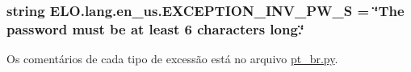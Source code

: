 \hypertarget{namespaceELO_1_1lang_1_1en__us_a1b23e43e3041caedae9ed318310bee4b}{
\subsubsection[{E\-X\-C\-E\-P\-T\-I\-O\-N\-\_\-\-I\-N\-V\-\_\-\-P\-W\-\_\-\-S}]{\setlength{\rightskip}{0pt plus 5cm}string E\-L\-O.\-lang.\-en\-\_\-us.\-E\-X\-C\-E\-P\-T\-I\-O\-N\-\_\-\-I\-N\-V\-\_\-\-P\-W\-\_\-\-S = \char`\"{}The password must be at least 6 characters long.\char`\"{}}}\label{dd/d09/namespaceELO_1_1lang_1_1en__us_a1b23e43e3041caedae9ed318310bee4b}


Os comentários de cada tipo de excessão está no arquivo \hyperlink{pt__br_8py}{pt\-\_\-br.\-py}. 

